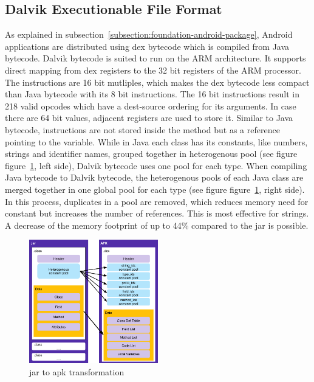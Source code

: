 \subsection{Dalvik Executionable File Format} \label{subsection:android-dex}
As explained in subsection~\ref{subsection:foundation-android-package}, Android applications are distributed using dex bytecode which is compiled from Java bytecode.
Dalvik bytecode is suited to run on the ARM architecture.
It supports direct mapping from dex registers to the 32 bit registers of the ARM processor.
The instructions are 16 bit mutliples, which makes the dex bytecode less compact than Java bytecode with its 8 bit instructions.
The 16 bit instructions result in 218 valid opcodes which have a dest-source ordering for its arguments. \cite{androidDalvik}
In case there are 64 bit values, adjacent registers are used to store it.
\newline
Similar to Java bytecode, instructions are not stored inside the method but as a reference pointing to the variable.
While in Java each class has its constants, like numbers, strings and identifier names, grouped together in heterogenous pool (see figure figure~\ref{fig:java}, left side), Dalvik bytecode uses one pool for each type.
When compiling Java bytecode to Dalvik bytecode,
the heterogenous pools of each Java class are merged together in one global pool for each type (see figure figure~\ref{fig:java}, right side).
In this process, duplicates in a pool are removed, which reduces memory need for constant but increases the number of references.
This is most effective for strings.
A decrease of the memory footprint of up to 44\% compared to the \gls{jar} is possible.
\newline
\begin{figure}[h]
    \centering
    \includegraphics[width=0.5\textwidth]{data/java.png}
    \caption{\gls{jar} to \gls{apk} transformation \cite{googleDalvik}}
    \label{fig:java}
\end{figure}
